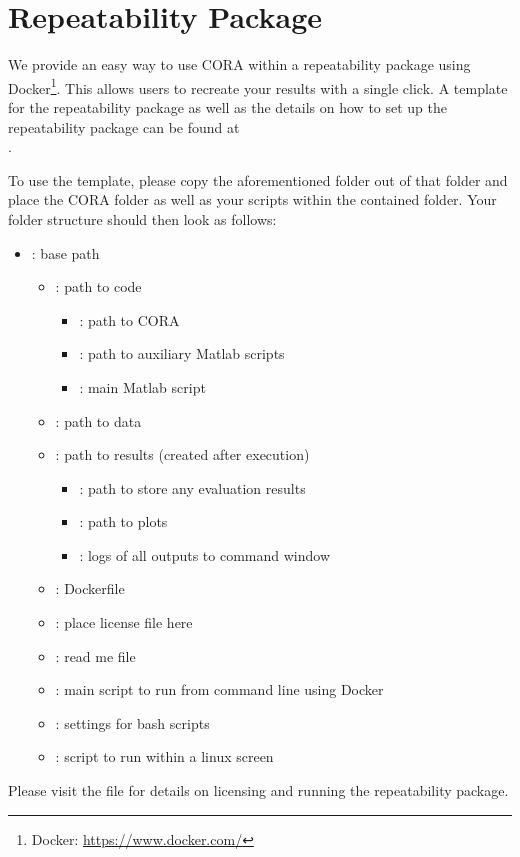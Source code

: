 \section{Repeatability Package}\label{sec:repeatability-package}

We provide an easy way to use CORA within a repeatability package using Docker\footnote{Docker: \url{https://www.docker.com/}}.
This allows users to recreate your results with a single click.
A template for the repeatability package as well as the details on how to set up the repeatability package can be found at \\
.

To use the template, please copy the aforementioned folder out of that folder
and place the CORA folder as well as your scripts within the contained  folder.
Your folder structure should then look as follows:

\begin{itemize}[label={}]
\item {}: base path
\begin{itemize}[label={}]
\item {}: path to code
\begin{itemize}[label={}]
\item {}: path to CORA
\item {}: path to auxiliary Matlab scripts
\item {}: main Matlab script
\end{itemize}

\item {}: path to data
\item {}: path to results (created after execution)
\begin{itemize}[label={}]
\item {}: path to store any evaluation results
\item {}: path to plots
\item {}: logs of all outputs to command window
\end{itemize}

\item {}: Dockerfile
\item {}: place license file here
\item {}: read me file
\item {}: main script to run from command line using Docker
\item {}: settings for bash scripts
\item {}: script to run  within a linux screen
\end{itemize}
\end{itemize}

Please visit the  file for details on licensing and running the repeatability package.